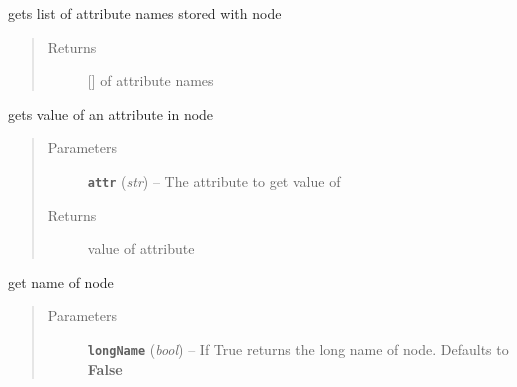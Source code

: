 \documentclass[letterpaper,10pt,english]{sphinxmanual}
\begin{document}
\begin{fulllineitems}
\begin{fulllineitems}
\label{zBuilder.nodes:zBuilder.nodes.base.BaseNode.get_attr_list}
gets list of attribute names stored with node
\begin{quote}\begin{description}
\item[{Returns}] \leavevmode
{[}{]} of attribute names

\end{description}\end{quote}

\end{fulllineitems}


\begin{fulllineitems}
\label{zBuilder.nodes:zBuilder.nodes.base.BaseNode.get_attr_value}
gets value of an attribute in node
\begin{quote}\begin{description}
\item[{Parameters}] \leavevmode
\textbf{\texttt{attr}} (\emph{str}) -- The attribute to get value of

\item[{Returns}] \leavevmode
value of attribute

\end{description}\end{quote}

\end{fulllineitems}


\begin{fulllineitems}
\label{zBuilder.nodes:zBuilder.nodes.base.BaseNode.get_maps}
\end{fulllineitems}


\begin{fulllineitems}
\label{zBuilder.nodes:zBuilder.nodes.base.BaseNode.get_name}
get name of node
\begin{quote}\begin{description}
\item[{Parameters}] \leavevmode
\textbf{\texttt{longName}} (\emph{bool}) -- If True returns the long name of node.  Defaults to \textbf{False}


\end{description}
\end{quote}
\end{fulllineitems}
\end{fulllineitems}
\end{document}

